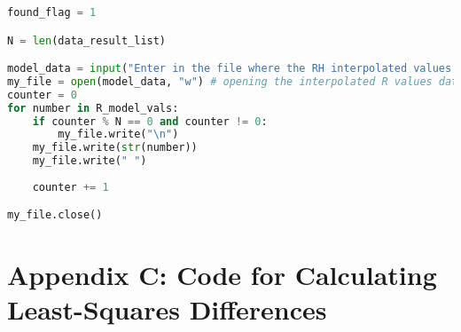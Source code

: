 \documentclass[11pt]{article}
\begin{document}
\begin{footnotesize}
\begin{lstlisting}[language=Python,showstringspaces=false]
                found_flag = 1

N = len(data_result_list)

model_data = input("Enter in the file where the RH interpolated values should be stored: ")
my_file = open(model_data, "w") # opening the interpolated R values data file e.g. 'test_model.dat'
counter = 0
for number in R_model_vals:
    if counter % N == 0 and counter != 0:
        my_file.write("\n")
    my_file.write(str(number))
    my_file.write(" ")
    
    counter += 1

my_file.close() 

\end{lstlisting}
\end{footnotesize}

\section*{Appendix C: Code for Calculating Least-Squares Differences}
\label{app:appendix_C}
\end{document}
